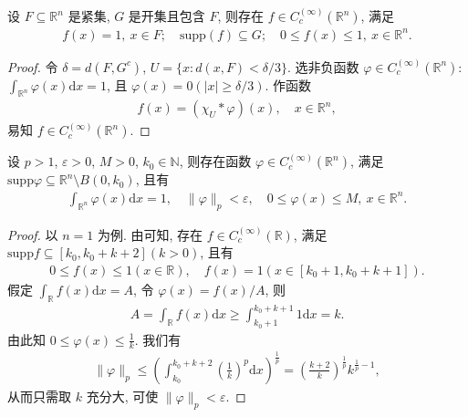 \documentclass[../../main.tex]{subfiles}%
\begin{document}
\begin{theorem}\label{theorem:实变函数--定理2882io}
设 $F\subseteq \mathbb{R}^n$ 是紧集, $G$ 是开集且包含 $F$, 则存在 $f\in C_c^{(\infty)}(\mathbb{R}^n)$, 满足
\begin{align*}
f(x)=1, \ x\in F; \quad \mathrm{supp}(f)\subseteq G; \quad 0\leqslant f(x)\leqslant 1, \ x\in \mathbb{R}^n.
\end{align*}
\end{theorem}

\begin{proof}

令 $\delta=d(F,G^c)$, $U=\{x: d(x,F)<\delta/3\}$. 选非负函数 $\varphi\in C_c^{(\infty)}(\mathbb{R}^n)$: $\int_{\mathbb{R}^n} \varphi(x) \mathrm{d}x=1$, 且 $\varphi(x)=0(|x|\geqslant \delta/3)$. 作函数
\begin{align*}
f(x) = (\chi_U * \varphi)(x), \quad x\in \mathbb{R}^n,
\end{align*}
易知 $f\in C_c^{(\infty)}(\mathbb{R}^n)$.

\end{proof}

\begin{corollary}
设 $p>1$, $\varepsilon>0$, $M>0$, $k_0\in \mathbb{N}$, 则存在函数 $\varphi\in C_c^{(\infty)}(\mathbb{R}^n)$, 满足 $\mathrm{supp}\varphi\subseteq \mathbb{R}^n\setminus B(0,k_0)$, 且有
\begin{align*}
\int_{\mathbb{R}^n} \varphi(x) \mathrm{d}x=1, \quad \|\varphi\|_p < \varepsilon, \quad 0\leqslant \varphi(x)\leqslant M, \ x\in \mathbb{R}^n.
\end{align*}
\end{corollary}
\begin{proof}

以 $n=1$ 为例. 由可知, 存在 $f\in C_c^{(\infty)}(\mathbb{R})$, 满足 $\mathrm{supp}f\subseteq [k_0,k_0+k+2](k>0)$, 且有
\begin{align*}
0\leqslant f(x)\leqslant 1(x\in \mathbb{R}), \quad f(x)=1(x\in [k_0+1,k_0+k+1]).
\end{align*}
假定 $\int_{\mathbb{R}} f(x) \mathrm{d}x=A$, 令 $\varphi(x)=f(x)/A$, 则
\begin{align*}
A = \int_{\mathbb{R}} f(x) \mathrm{d}x \geqslant \int_{k_0+1}^{k_0+k+1} 1 \mathrm{d}x = k.
\end{align*}
由此知 $0\leqslant \varphi(x)\leqslant \frac{1}{k}$. 我们有
\begin{align*}
\|\varphi\|_p \leqslant \left( \int_{k_0}^{k_0+k+2} \left( \frac{1}{k} \right)^p \mathrm{d}x \right)^{\frac{1}{p}} = \left( \frac{k+2}{k} \right)^{\frac{1}{p}} k^{\frac{1}{p}-1},
\end{align*}
从而只需取 $k$ 充分大, 可使 $\|\varphi\|_p<\varepsilon$.
\end{proof}
\end{document}
